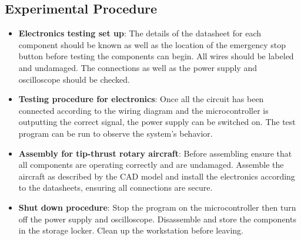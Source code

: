             \subsection*{Experimental Procedure}
            \vspace*{-1mm}
                \begin{itemize}
                    \item \textbf{Electronics testing set up}:
                        The details of the datasheet for each component should be known as well as the location of the emergency stop button before testing the components can begin. All wires should be labeled and undamaged. The connections as well as the power supply and oscilloscope should be checked.
                        \vspace*{-1mm}
                    \item \textbf{Testing procedure for electronics}:
                        Once all the circuit has been connected according to the wiring diagram and the microcontroller is outputting the correct signal, the power supply can be switched on. The test program can be run to observe the system's behavior. 
                        \vspace*{-1mm}
                    \item \textbf{Assembly for tip-thrust rotary aircraft}:
                        Before assembling ensure that all components are operating correctly and are undamaged. Assemble the aircraft as described by the CAD model and install the electronics according to the datasheets, ensuring all connections are secure. 
                        \vspace*{-1mm}
                    \item \textbf{Shut down procedure}:
                        Stop the program on the microcontroller then turn off the power supply and oscilloscope. Disassemble and store the components in the storage locker. Clean up the workstation before leaving.
                \end{itemize}

